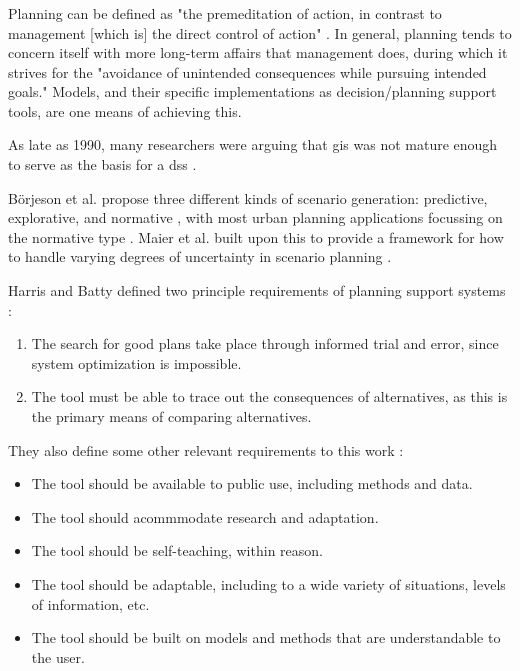 \subsubsection{}


Planning can be defined as "the premeditation of action, in contrast to management [which is] the direct control of action" \cite{harrisLocationalModelsGeographic1993}. In general, planning tends to concern itself with more long-term affairs that management does, during which it strives for the "avoidance of unintended consequences while pursuing intended goals." Models, and their specific implementations as decision/planning support tools, are one means of achieving this.

As late as 1990, many researchers were arguing that \ac{gis} was not mature enough to serve as the basis for a \ac{dss} \cite{jankowskiIntegratingGeographicalInformation1995}.

Börjeson et al. propose three different kinds of scenario generation: predictive, explorative, and normative \cite{borjesonScenarioTypesTechniques2006}, with most urban planning applications focussing on the normative type \cite{avinUsingExploratoryScenarios2020}. Maier et al. built upon this to provide a framework for how to handle varying degrees of uncertainty in scenario planning \cite{maierUncertainFutureDeep2016}. 


Harris and Batty defined two principle requirements of planning support systems \cite{harrisLocationalModelsGeographic1993}:
\begin{enumerate}[itemsep=0pt,parsep=0pt]
	\item{The search for good plans take place through informed trial and error, since system optimization is impossible.}
	\item{The tool must be able to trace out the consequences of alternatives, as this is the primary means of comparing alternatives.}
\end{enumerate}

They also define some other relevant requirements to this work \cite{harrisLocationalModelsGeographic1993}:
\begin{itemize}[itemsep=0pt,parsep=0pt]
	\item{The tool should be available to public use, including methods and data.}
	\item{The tool should acommmodate research and adaptation.}
	\item{The tool should be self-teaching, within reason.}
	\item{The tool should be adaptable, including to a wide variety of situations, levels of information, etc.}
	\item{The tool should be built on models and methods that are understandable to the user.}
\end{itemize}





